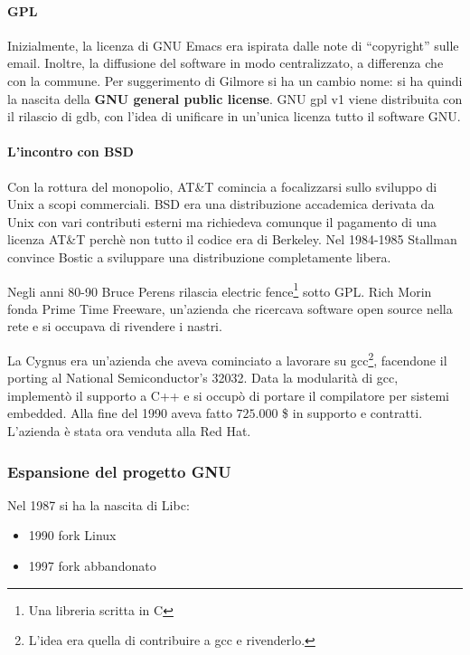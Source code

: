 \paragraph*{GPL} Inizialmente, la licenza di GNU Emacs era ispirata dalle note di ``copyright'' sulle email. Inoltre, la diffusione del software in modo centralizzato, a differenza che con la commune. Per suggerimento di Gilmore si ha un cambio nome: si ha quindi la nascita della \textbf{GNU general public license}. GNU gpl v1 viene distribuita con il rilascio di gdb, con l'idea di unificare in un'unica licenza tutto il software GNU.

\paragraph*{L'incontro con BSD} Con la rottura del monopolio, AT\&T comincia a focalizzarsi sullo sviluppo di Unix a scopi commerciali. BSD era una distribuzione accademica derivata da Unix con vari contributi esterni ma richiedeva comunque il pagamento di una licenza AT\&T perch\`e non tutto il codice era di Berkeley. Nel 1984-1985 Stallman convince Bostic a sviluppare una distribuzione completamente libera.

Negli anni 80-90 Bruce Perens rilascia electric fence\footnote{Una libreria scritta in C} sotto GPL. Rich Morin fonda Prime Time Freeware, un'azienda che ricercava software open source nella rete e si occupava di rivendere i nastri.

La Cygnus era un'azienda che aveva cominciato a lavorare su gcc\footnote{L'idea era quella di contribuire a gcc e rivenderlo.}, facendone il porting al National Semiconductor's 32032. Data la modularit\`a di gcc, implement\`o il supporto a C++ e si occup\`o di portare il compilatore per sistemi embedded. Alla fine del 1990 aveva fatto $725.000$ \$ in supporto e contratti. L'azienda \`e stata ora venduta alla Red Hat.

\subsubsection{Espansione del progetto GNU}

Nel 1987 si ha la nascita di Libc:
\begin{itemize}

\item 1990 fork Linux
\item 1997 fork abbandonato

\end{itemize}

